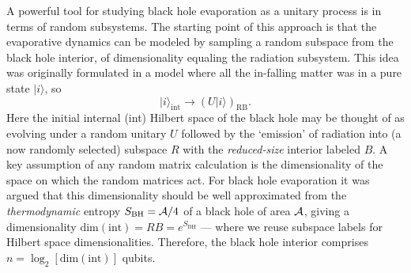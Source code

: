 \documentclass[aps,prl,amsmath,amssymb,floatfix,12pt]{revtex4}
\begin{document}
\noindent A powerful tool for studying black hole evaporation as a unitary process
is in terms of random subsystems. The starting point of this approach is
that the evaporative dynamics can be modeled by sampling a random 
subspace from the black hole interior, of dimensionality equaling 
the radiation subsystem. This idea was originally formulated \cite{Page93}
in a model where all the in-falling matter was in a pure state
$|i\rangle$, so 
\begin{equation}
|i\rangle_{\text{int}}\rightarrow (U|i\rangle)_{\text{RB}}. \label{Page}
\end{equation}
Here the initial internal (int) Hilbert space of the black hole may
be thought of as evolving under a random unitary $U$ followed by
the `emission' of radiation into (a now randomly selected) subspace $R$
with the {\it reduced-size\/} interior labeled $B$. A key assumption
of any random matrix calculation is the dimensionality of the space 
on which the random matrices act. For black hole evaporation it was
argued \cite{Page93} that this dimensionality should be well
approximated from the {\it thermodynamic\/} entropy
$S_{\text{BH}}={\cal A}/4$ of a black hole of area ${\cal A}$, 
giving a dimensionality
$\text{dim}(\text{int})= R B= e^{S_{\text{BH}}}$ --- where we reuse
subspace labels for Hilbert space dimensionalities. Therefore,
the black hole interior comprises $n=\log_2[\text{dim}(\text{int})]$
qubits.
\end{document}
